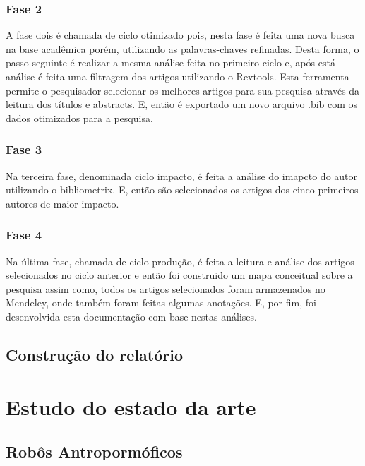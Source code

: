 \subsection{Fase 2}
\label{sec:fase2}

A fase dois é chamada de ciclo otimizado pois, nesta fase é feita uma nova busca na base acadêmica porém, utilizando as palavras-chaves refinadas. Desta forma, o passo seguinte é realizar a mesma análise feita no primeiro ciclo e, após está análise é feita uma filtragem dos artigos utilizando o Revtools. Esta ferramenta permite o pesquisador selecionar os melhores artigos para sua pesquisa através da leitura dos títulos e abstracts. E, então é exportado um novo arquivo .bib com os dados otimizados para a pesquisa. 

\subsection{Fase 3}
\label{sec:fase3}

Na terceira fase, denominada ciclo impacto, é feita a análise do imapcto do autor utilizando o bibliometrix. E, então são selecionados os artigos dos cinco primeiros autores de maior impacto.

\subsection{Fase 4}
\label{sec:fase4}

Na última fase, chamada de ciclo produção, é feita a leitura e análise dos artigos selecionados no ciclo anterior e então foi construido um mapa conceitual sobre a pesquisa assim como, todos os artigos selecionados foram armazenados no Mendeley, onde também foram feitas algumas anotações. E, por fim, foi desenvolvida esta documentação com base nestas análises.


\section{Construção do relatório}
\label{sec:const}


\chapter{Estudo do estado da arte}
\label{chap:sota}

\section{Robôs Antropormóficos}
\label{ssec:robos}

